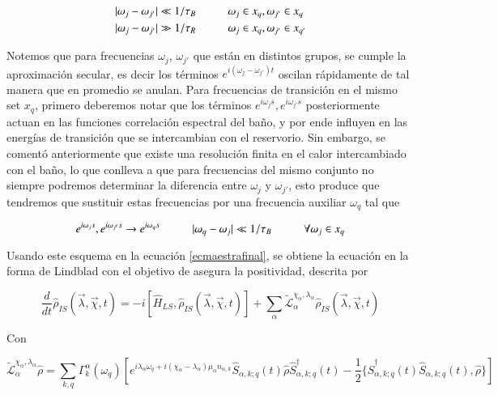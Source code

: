 \begin{align*}
    |\omega_{j}-\omega_{j'}| \ll 1/\tau_{B}  &\hspace{10mm} \omega_{j} \in x_{q}, \omega_{j'} \in x_{q} \\
    |\omega_{j}-\omega_{j'}| \gg 1/\tau_{R}  &\hspace{10mm} \omega_{j} \in x_{q}, \omega_{j'} \in x_{q'}
\end{align*}

Notemos que para frecuencias $\omega_{j}$, $\omega_{j'}$ que están en distintos grupos, se cumple la aproximación secular, es decir los términos $e^{i(\omega_{j} - \omega_{j'})t}$ oscilan rápidamente de tal manera que en promedio se anulan. Para frecuencias de transición en el mismo set $x_{q}$, primero deberemos notar que los términos $e^{i\omega_{j}s},e^{i\omega_{j'}s}$ posteriormente actuan en las funciones correlación espectral del baño, y por ende influyen en las energías de transición que se intercambian con el reservorio. Sin embargo, se comentó anteriormente que existe una resolución finita en el calor intercambiado con el baño, lo que conlleva a que para frecuencias del mismo conjunto no siempre podremos determinar la diferencia entre $\omega_{j}$ y $\omega_{j'}$, esto produce que tendremos que sustituir estas frecuencias por una frecuencia auxiliar $\omega_{q}$ tal que

\begin{equation*}
    e^{i\omega_{j}s},e^{i\omega_{j'}s} \to e^{i\omega_{q}s} \hspace{10mm} |\omega_{q} - \omega_{j}| \ll 1/\tau_{B} \hspace{10mm} \forall \omega_{j} \in x_{q} 
\end{equation*}

Usando este esquema en la ecuación \ref{ecmaestrafinal}, se obtiene la ecuación en la forma de Lindblad con el objetivo de asegura la positividad\cite{chruscinski2017brief}, descrita por

\begin{equation*}
    \frac{d}{dt}\hat{\rho}_{IS}(\vec{\lambda},\vec{\chi},t) = -i[\hat{H}_{LS},\hat{\rho}_{IS}(\vec{\lambda},\vec{\chi},t)] + \sum_{\alpha}\tilde{\mathcal{L}}^{\chi_{\alpha},\lambda_{\alpha}}_{\alpha} \hat{\rho}_{IS}(\vec{\lambda},\vec{\chi},t)
\end{equation*}

Con

\begin{equation*}
    \tilde{\mathcal{L}}^{\chi_{\alpha},\lambda_{\alpha}}_{\alpha}\hat{\rho} = \sum_{k,q}\Gamma^{\alpha}_{k}(\omega_{q}) \left[e^{i\lambda_{\alpha}\omega_{q} + i(\chi_{\alpha}-\lambda_{\alpha})\mu_{\alpha}n_{\alpha,k}}\hat{S}_{\alpha,k;q}(t)\hat{\rho}\hat{S}^{\dagger}_{\alpha,k;q}(t) - \frac{1}{2}\{\hat{S}^{\dagger}_{\alpha,k;q}(t)\hat{S}_{\alpha,k;q}(t),\hat{\rho} \} \right] 
\end{equation*}

